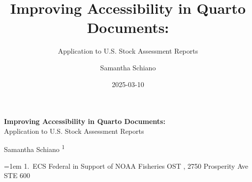 \documentclass[
]{scrartcl}
\title{Improving Accessibility in Quarto Documents:}
\subtitle{Application to U.S. Stock Assessment Reports}
\author{Samantha Schiano}
\date{2025-03-10}
\begin{document}
  \begin{titlepage}

  \begin{minipage}[b][\textheight][s]{\textwidth}
  \raggedright




  {\huge\bfseries\nohyphens{Improving Accessibility in Quarto
  Documents:}}\\[1\baselineskip]
  {\large{Application to U.S. Stock Assessment
  Reports}}\\[4\baselineskip]

  \vspace{1\baselineskip}


  \vspace{1\baselineskip}

  {\large{Samantha Schiano}}%
  {\textsuperscript{1}}%



  \vspace{2\baselineskip}

  \hangindent=1em
  {1}.~{ECS Federal in Support of NOAA Fisheries OST}%
  , %
  {2750 Prosperity Ave STE 600}%


  \vspace{1\baselineskip}



  \vfill


  \vspace{1\baselineskip}


\end{minipage}
\end{titlepage}
\end{document}
